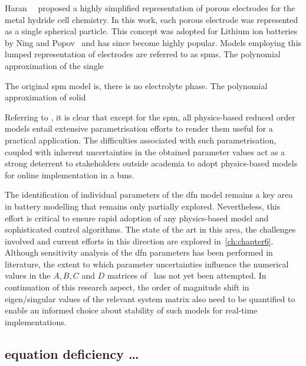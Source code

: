 Haran~\etal{}~\cite{Haran1998} proposed  a highly simplified  representation of
porous electrodes  for the metal  hydride cell chemistry.  In this work,  each porous
electrode  was represented  as a  single  spherical particle. This concept  was
adopted for Lithium ion batteries by Ning and Popov~\cite{Ning2004} and has
since become highly popular. Models employing this lumped representation of
electrodes are referred to as \gls{spm}s. The polynomial approximation of the
single

The original \gls{spm} model is, there
is no electrolyte phase.
The polynomial approximation of solid


Referring  to  ,  it  is  clear that  except  for
the  \gls{spm},   all  physics-based  reduced  order   models  entail  extensive
parametrisation efforts   to render  them useful for a  practical application.
The  difficulties associated  with such  parametrisation, coupled  with inherent
uncertainties  in  the obtained  parameter  values  act  as a  strong  deterrent
to  stakeholders  outside academia  to  adopt  physics-based models  for  online
implementation in a \gls{bms}.




 The  identification of  individual parameters  of the  \gls{dfn}
model  remains a  key  area in  battery modelling  that  remains only  partially
explored. Nevertheless, this effort is critical  to ensure rapid adoption of any
physics-based model and  sophisticated control algorithms. The state  of the art
in this area, the challenges involved  and current efforts in this direction are
explored in~\cref{ch:chapter6}.  Although sensitivity analysis of  the \gls{dfn}
parameters has been performed in  literature,  the extent to
which  parameter uncertainties  influence the  numerical  values in  the $A,  B,
C$  and  $D$  matrices  of~ has  not  yet  been  attempted.
In  continuation of  this  research  aspect, the  order  of  magnitude shift  in
eigen/singular values of  the relevant system matrix also need  to be quantified
to  enable an  informed  choice about  stability of  such  models for  real-time
implementations.

\subsection{equation deficiency \dots}\label{temp:eqndeficiency}

